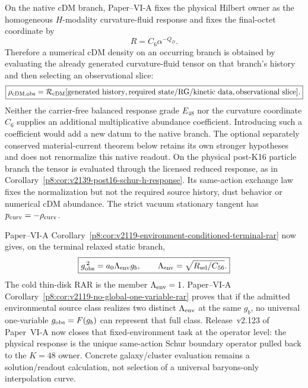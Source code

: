 \documentclass[12pt,a4paper]{article}
\begin{document}
\begin{corollary}
\label{p9:cor:v190-native-k48-abundance-history-functional}
On the native cDM branch, Paper--VI-A fixes the physical Hilbert owner as the
homogeneous $H$-modality curvature-fluid response and fixes the final-octet
coordinate by
\[
 R=C_6\alpha^{-Q_D}.
\]
Therefore a numerical cDM density on an occurring branch is obtained by
evaluating the already generated curvature-fluid tensor on that branch's
history and then selecting an observational slice:
\[
 \boxed{
 \rho_{\rm cDM,obs}
 =\mathcal R_{\rm cDM}
 [\text{generated history},\text{required state/RG/kinetic data},
  \text{observational slice}].}
\]
Neither the carrier-free balanced response grade $E_{48}$ nor the curvature
coordinate $C_6$ supplies an additional multiplicative abundance coefficient.
Introducing such a coefficient would add a new datum to the native branch.
The optional separately conserved material-current theorem below retains its
own stronger hypotheses and does not renormalize this native readout.
On the physical post-K16 particle branch the tensor is evaluated through the
licensed reduced response, as in
Corollary~\ref{p8:cor:v2139-post16-schur-h-response}.  Its same-action
exchange law fixes the normalization but not the required source history,
dust behavior or numerical cDM abundance.  The strict vacuum stationary
tangent has $p_{\rm curv}=-\rho_{\rm curv}$.
\end{corollary}

\begin{corollary}
\label{p9:cor:v190-environment-conditioned-rar-import}
Paper--VI-A Corollary~\ref{p8:cor:v2119-environment-conditioned-terminal-rar}
now gives, on the terminal relaxed static branch,
\[
 \boxed{g_{\rm obs}^{\,2}=a_0\Lambda_{\rm env}g_b,
 \qquad
 \Lambda_{\rm env}=\sqrt{R_{\rm sel}/C_{56}}.}
\]
The cold thin-disk RAR is the member $\Lambda_{\rm env}=1$.  Paper--VI-A
Corollary~\ref{p8:cor:v2119-no-global-one-variable-rar} proves that if the
admitted environmental source class realizes two distinct
$\Lambda_{\rm env}$ at the same $g_b$, no universal one-variable
$g_{\rm obs}=F(g_b)$ can represent that full class.  Release~v2.123 of Paper~VI-A now closes that fixed-environment task at the
operator level: the physical response is the unique same-action Schur boundary
operator pulled back to the $K=48$ owner.  Concrete galaxy/cluster evaluation
remains a solution/readout calculation, not selection of a universal
baryons-only interpolation curve.
\end{corollary}
\end{document}
